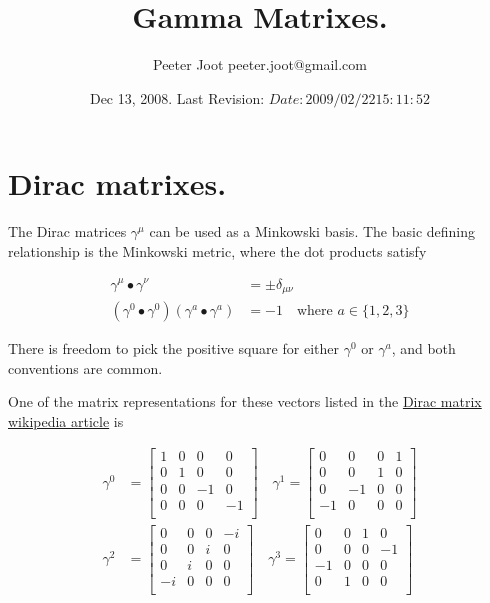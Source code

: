 \documentclass{article}
\title{ Gamma Matrixes. }
\author{Peeter Joot \quad peeter.joot@gmail.com}
\date{ Dec 13, 2008.  Last Revision: $Date: 2009/02/22 15:11:52 $ }
\newcommand{\scalarProduct}[2]{{#1} \bullet {#2}}
\begin{document}
\maketitle{}


\section{ Dirac matrixes. }

The Dirac matrices $\gamma^\mu$ can be used as a Minkowski basis.  The basic defining relationship is the Minkowski metric, where the dot products satisfy

\begin{align*}
\scalarProduct{\gamma^\mu}{\gamma^\nu} &= \pm \delta_{\mu\nu} \\
(\scalarProduct{\gamma^0}{\gamma^0})(\scalarProduct{\gamma^a}{\gamma^a}) &= -1 \quad \text{where $a \in \{1,2,3\}$}
\end{align*}

There is freedom to pick the positive square for either $\gamma^0$ or $\gamma^a$, and both conventions are common.

One of the matrix representations for these vectors listed in the 
\href{http://en.wikipedia.org/wiki/Gamma_matrices}{Dirac matrix wikipedia article}
is

\begin{align}\label{eqn:basis}
\gamma^0 &= \begin{bmatrix}
 1  &  0  &  0  &  0  \\
 0  &  1  &  0  &  0  \\
 0  &  0  &  -1  &  0  \\
 0  &  0  &  0  &  -1  \\
\end{bmatrix} \quad
\gamma^1 = \begin{bmatrix}
 0  &  0  &  0  &  1  \\
 0  &  0  &  1  &  0  \\
 0  &  -1  &  0  &  0  \\
 -1  &  0  &  0  &  0  \\
\end{bmatrix} \\
\gamma^2 &= \begin{bmatrix}
 0  &  0  &  0  &  -i  \\
 0  &  0  &  i  &  0  \\
 0  &  i  &  0  &  0  \\
 -i  &  0  &  0  &  0  \\
\end{bmatrix}
\quad \gamma^3 = \begin{bmatrix}
 0  &  0  &  1  &  0  \\
 0  &  0  &  0  &  -1  \\
 -1  &  0  &  0  &  0  \\
 0  &  1  &  0  &  0  \\
\end{bmatrix}
\end{align}
\end{document}

